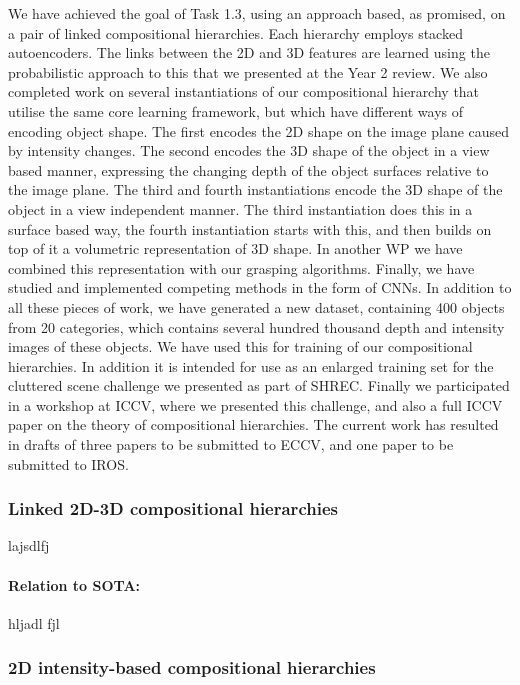 \documentclass[a4paper,11pt,pdf]{pacmanreport}
\begin{document}
We have achieved the goal of Task 1.3, using an approach based, as promised, on a pair of linked compositional hierarchies. Each hierarchy employs stacked autoencoders. The links between the 2D and 3D features are learned using the probabilistic approach to this that we presented at the Year 2 review. We also completed work on several instantiations of our compositional hierarchy that utilise the same core learning framework, but which have different ways of encoding object shape. The first encodes the 2D shape on the image plane caused by intensity changes. The second encodes the 3D shape of the object in a view based manner, expressing the changing depth of the object surfaces relative to the image plane. The third and fourth instantiations encode the 3D shape of the object in a view independent manner. The third instantiation does this in a surface based way, the fourth instantiation starts with this, and then builds on top of it a volumetric representation of 3D shape. In another WP we have combined this representation with our grasping algorithms. Finally, we have studied and implemented competing methods in the form of CNNs. In addition to all these pieces of work, we have generated a new dataset, containing 400 objects from 20 categories, which contains several hundred thousand depth and intensity images of these objects. We have used this for training of our compositional hierarchies. In addition it is intended for use as an enlarged training set for the cluttered scene challenge we presented as part of SHREC. Finally we participated in a workshop at ICCV, where we presented this challenge, and also a full ICCV paper on the theory of compositional hierarchies. The current work has resulted in drafts of three papers to be submitted to ECCV, and one paper to be submitted to IROS.

\subsubsection{Linked 2D-3D compositional hierarchies}

lajsdlfj

\paragraph{Relation to SOTA:} hljadl fjl


\subsubsection{2D intensity-based compositional hierarchies}
\end{document}
